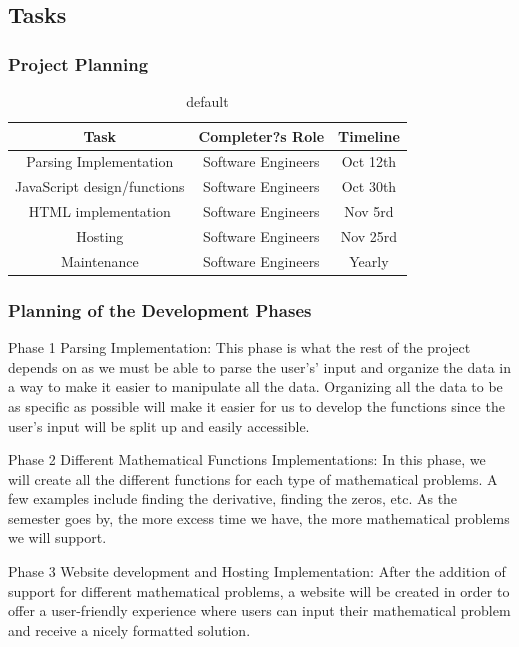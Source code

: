 \documentclass[11pt, oneside]{article}
\begin{document}
\subsection{Tasks}
\subsubsection{Project Planning}
\begin{table}[H]
\caption{default}
\begin{center}
\begin{tabular}{|c|c|c|}
\hline
Task    & Completer?s Role & Timeline\\
\hline
Parsing Implementation & Software Engineers & Oct 12th\\
\hline
JavaScript design/functions & Software Engineers & Oct 30th\\
\hline
HTML implementation & Software Engineers & Nov 5rd\\
\hline
Hosting & Software Engineers & Nov 25rd\\
\hline
Maintenance & Software Engineers & Yearly\\
\hline
\end{tabular}
\end{center}
\label{default}
\end{table}%


\subsubsection{Planning of the Development Phases}
Phase 1 Parsing Implementation:
This phase is what the rest of the project depends on as we must be able to parse the user's’ input and organize the data in a way to make it easier to manipulate all the data. Organizing all the data to be as specific as possible will make it easier for us to develop the functions since the user’s input will be split up and easily accessible.

Phase 2 Different Mathematical Functions Implementations:
In this phase, we will create all the different functions for each type of mathematical problems. A few examples include finding the derivative, finding the zeros, etc. As the semester goes by, the more excess time we have, the more mathematical problems we will support.

Phase 3 Website development and Hosting Implementation:
After the addition of support for different mathematical problems, a website will be created in order to offer a user-friendly experience where users can input their mathematical problem and receive a nicely formatted solution.
\end{document}
